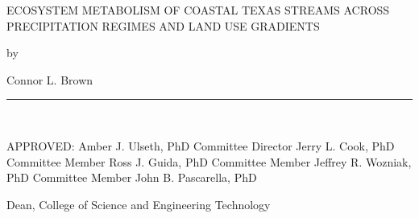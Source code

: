 \pagestyle{empty}
\begin{center}
ECOSYSTEM METABOLISM OF COASTAL TEXAS STREAMS ACROSS PRECIPITATION REGIMES AND LAND USE GRADIENTS
\vskip20pt
{by \par}
\vskip20pt
{Connor L. Brown\par}
\vskip22pt
\rule{6em}{0.4pt}\\
\end{center}
\vskip4pt
\par
\hspace{196pt} APPROVED:
\vskip19pt
\hspace{196pt}
\vskip-13pt
\hspace{196pt}Amber J. Ulseth, PhD
\vskip-11pt
\hspace{196pt}Committee Director
\hspace{196pt}
\vskip10pt
\vskip-13pt
\hspace{196pt}Jerry L. Cook, PhD
\vskip-11pt
\hspace{196pt}Committee Member
\hspace{196pt}
\vskip10pt
\vskip-13pt
\hspace{196pt}Ross J. Guida, PhD
\vskip-11pt
\hspace{196pt}Committee Member
\hspace{196pt}
\vskip10pt
\vskip-13pt
\hspace{196pt}Jeffrey R. Wozniak, PhD
\vskip-11pt
\hspace{196pt}Committee Member
\vskip-11pt
\hspace{-1pt}
\vskip-13pt
\hspace{196pt}
John B. Pascarella, PhD\par
\vskip-11pt
\hspace{196pt}
Dean, College of Science and Engineering
\vskip-11pt
\hspace{196pt}
Technology\par
\vfil\null


\endinput

